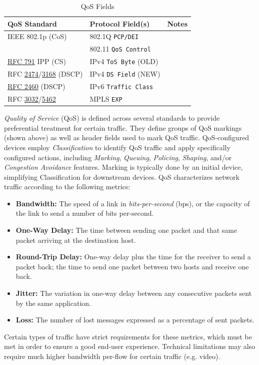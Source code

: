 \documentclass[12pt]{article}
\newcommand{\rfc}[1]{\href{https://datatracker.ietf.org/doc/html/rfc#1}{#1}}
\newcommand{\RFC}[1]{\href{https://datatracker.ietf.org/doc/html/rfc#1}{RFC #1}}
\begin{document}
	\begin{table}[H]
	\centering
	\caption{QoS Fields \label{tab:QOS FIELDS}}
	\begin{tabular}{@{} l l r @{}}\hline
	\textbf{QoS Standard} 			& \textbf{Protocol Field(s)}		& \textbf{Notes}\\\hline
	IEEE 802.1p (CoS)				& 802.1Q \texttt{PCP/DEI} 		& \Cref{tab:802.1Q}\\\hline
							& 802.11 \texttt{QoS Control} 		& \Cref{subsec:802.11 WLANS}\\\hline
	\RFC{791} IPP (CS)			& IPv4 \texttt{ToS Byte} (OLD) 	& \Cref{subsec:IPV4}\\
	RFC \rfc{2474}/\rfc{3168} (DSCP)	& IPv4 \texttt{DS Field} (NEW) 	& \Cref{subsec:IPV4}\\\hline
	\RFC{2460} (DSCP)			& IPv6 \texttt{Traffic Class} 		& \Cref{subsec:IPV6}\\\hline
	RFC \rfc{3032}/\rfc{5462}		& MPLS \texttt{EXP}			& \Cref{sec:MPLS}\\\hline
	\end{tabular}\end{table}
	\textit{Quality of Service} (QoS) is defined across several standards to provide preferential treatment for certain traffic. They define groups of QoS markings (shown above) as well as header fields used to mark QoS traffic. QoS-configured devices employ \textit{Classification} to identify QoS traffic and apply specifically configured actions, including \textit{Marking}, \textit{Queuing}, \textit{Policing}, \textit{Shaping}, and/or \textit{Congestion Avoidance} features. Marking is typically done by an initial device, simplifying Classification for downstream devices. QoS characterizes network traffic according to the following metrics:

	\begin{itemize}
		\label{itm:QOS METRICS}
		\item{\textbf{Bandwidth:} The speed of a link in \textit{bits-per-second} (bps), or the capacity of the link to send a number of bits per-second.}
		\item{\textbf{One-Way Delay:} The time between sending one packet and that same packet arriving at the destination host.}
		\item{\textbf{Round-Trip Delay:} One-way delay plus the time for the receiver to send a packet back; the time to send one packet between two hosts and receive 					one back.}
		\item{\textbf{Jitter:} The variation in one-way delay between any consecutive packets sent by the same application.}
		\item{\textbf{Loss:} The number of lost messages expressed as a percentage of sent packets.}
	\end{itemize}
	Certain types of traffic have strict requirements for these metrics, which must be met in order to ensure a good end-user experience. Technical limitations may also require much higher bandwidth per-flow for certain traffic (e.g. video).
	
\end{document}
